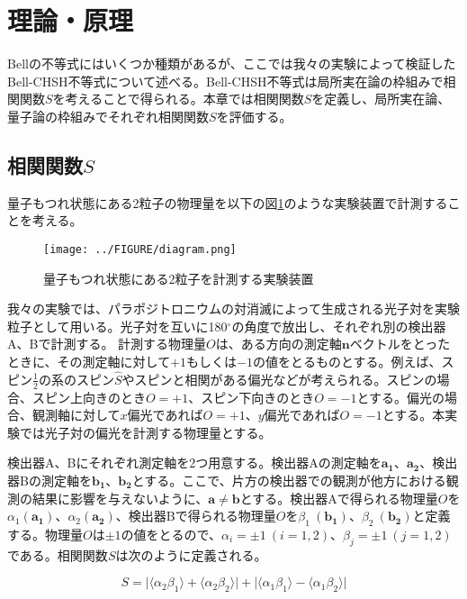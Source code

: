 \documentclass[../../main.tex]{subfiles}
\numberwithin{equation}{section}
\numberwithin{table}{section}
\numberwithin{figure}{section}
\begin{document}
\section{理論・原理}

Bellの不等式にはいくつか種類があるが、ここでは我々の実験によって検証したBell-CHSH不等式について述べる。Bell-CHSH不等式は局所実在論の枠組みで相関関数$S$を考えることで得られる。本章では相関関数$S$を定義し、局所実在論、量子論の枠組みでそれぞれ相関関数$S$を評価する。 

\subsection{相関関数$S$}
 
量子もつれ状態にある2粒子の物理量を以下の図\ref{fig:diagram}のような実験装置で計測することを考える。

\begin{figure}[htbp]
	\centering
	\texttt{[image: ../FIGURE/diagram.png]}
	\caption{量子もつれ状態にある2粒子を計測する実験装置}
	\label{fig:diagram}
\end{figure}

我々の実験では、パラポジトロニウムの対消滅によって生成される光子対を実験粒子として用いる。光子対を互いに180$^\circ$の角度で放出し、それぞれ別の検出器A、Bで計測する。
計測する物理量$O$は、ある方向の測定軸$\mathbf{n}$ベクトルをとったときに、その測定軸に対して$+1$もしくは$-1$の値をとるものとする。例えば、スピン$\frac{1}{2}$の系のスピン$\hat{S}$やスピンと相関がある偏光などが考えられる。スピンの場合、スピン上向きのとき$O=+1$、スピン下向きのとき$O=-1$とする。偏光の場合、観測軸に対して$x$偏光であれば$O=+1$、$y$偏光であれば$O=-1$とする。本実験では光子対の偏光を計測する物理量とする。

検出器A、Bにそれぞれ測定軸を2つ用意する。検出器Aの測定軸を$\mathbf{a_1}$、$\mathbf{a_2}$、検出器Bの測定軸を$\mathbf{b_1}$、$\mathbf{b_2}$とする。ここで、片方の検出器での観測が他方における観測の結果に影響を与えないように、$\mathbf{a} \neq \mathbf{b}$とする。検出器Aで得られる物理量$O$を$\alpha_1(\mathbf{a_1})$、$\alpha_2(\mathbf{a_2})$、検出器Bで得られる物理量$O$を$\beta_1\ (\mathbf{b_1})$、$\beta_2\ (\mathbf{b_2})$と定義する。物理量$O$は$\pm1$の値をとるので、$\alpha_i=\pm1\ (i=1,2)$、$\beta_j=\pm1\ (j=1,2)$である。相関関数$S$は次のように定義される。

\begin{equation}
	S=\lvert \langle \alpha_2\beta_1 \rangle + \langle \alpha_2\beta_2 \rangle	\rvert+
	          \lvert \langle \alpha_1\beta_1 \rangle - \langle \alpha_1\beta_2 \rangle	\rvert
						\label{eq:S}
\end{equation}
	
\end{document}
